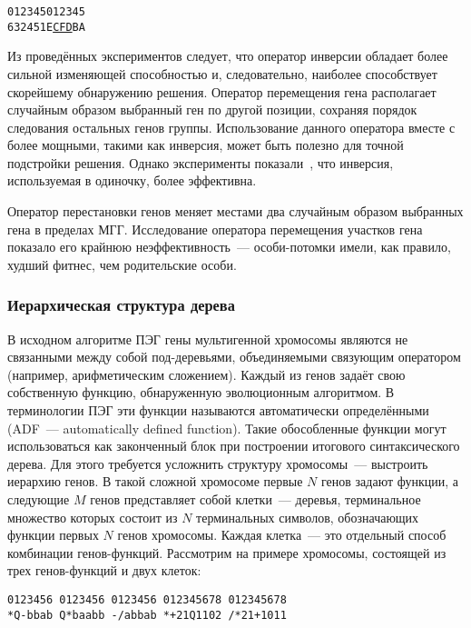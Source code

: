 \begin{samepage}
\begin{alltt}
012345 012345
632451 E{\underline{CFD}}BA
\end{alltt}
\end{samepage}

Из проведённых экспериментов следует, что оператор инверсии обладает более сильной изменяющей способностью и, следовательно, наиболее способствует скорейшему обнаружению решения.
Оператор перемещения гена располагает случайным образом выбранный ген по другой позиции, сохраняя порядок следования остальных генов группы. Использование данного оператора вместе с более мощными, такими как инверсия, может быть полезно для точной подстройки решения. Однако эксперименты показали~\cite{ferreira:2002:ASIA}, что инверсия, используемая в одиночку, более эффективна.

Оператор перестановки генов меняет местами два случайным образом выбранных гена в пределах МГГ. Исследование оператора перемещения участков гена показало его крайнюю неэффективность~--- особи-потомки имели, как правило, худший фитнес, чем родительские особи.


\subsubsection{Иерархическая структура дерева}

В исходном алгоритме ПЭГ гены мультигенной хромосомы являются не связанными между собой под-деревьями, объединяемыми связующим оператором (например, арифметическим сложением). Каждый из генов задаёт свою собственную функцию, обнаруженную эволюционным алгоритмом. В терминологии ПЭГ эти функции называются автоматически определёнными (ADF~--- automatically defined function). Такие обособленные функции могут использоваться как законченный блок при построении итогового синтаксического дерева. Для этого требуется усложнить структуру хромосомы~--- выстроить иерархию генов. В такой сложной хромосоме первые $N$ генов задают функции, а следующие $M$ генов представляет собой клетки~--- деревья, терминальное множество которых состоит из $N$ терминальных символов, обозначающих функции первых $N$ генов хромосомы. Каждая клетка~--- это отдельный способ комбинации генов-функций.
Рассмотрим на примере хромосомы, состоящей из трех генов-функций и двух клеток:

\begin{samepage}
\begin{verbatim}
0123456 0123456 0123456 012345678 012345678
*Q-bbab Q*baabb -/abbab *+21Q1102 /*21+1011
\end{verbatim}
\end{samepage}

